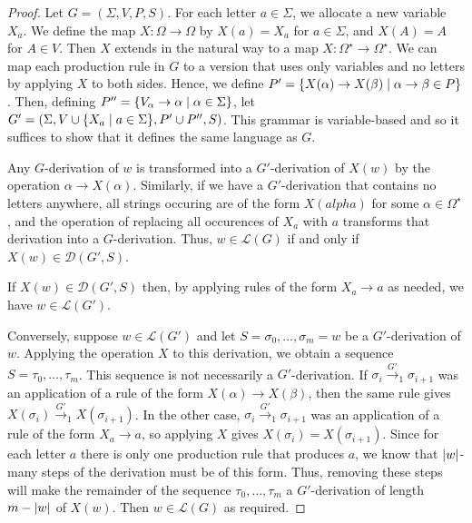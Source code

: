 \begin{proof}
	Let \( G = (\Sigma, V, P, S) \).
	For each letter \( a \in \Sigma \), we allocate a new variable \( X_a \).
	We define the map \( X \colon \Omega \to \Omega \) by \( X(a) = X_a \) for \( a \in \Sigma \), and \( X(A) = A \) for \( A \in V \).
	Then \( X \) extends in the natural way to a map \( X \colon \Omega^\star \to \Omega^\star \).
	We can map each production rule in \( G \) to a version that uses only variables and no letters by applying \( X \) to both sides.
	Hence, we define \( P' = \qty{X(\alpha) \to X(\beta) \mid \alpha \to \beta \in P} \).
	Then, defining \( P'' = \qty{V_\alpha \to \alpha \mid \alpha \in \Sigma} \), let \( G' = (\Sigma, V \cup \qty{X_a \mid a \in \Sigma}, P' \cup P'', S) \).
	This grammar is variable-based and so it suffices to show that it defines the same language as \( G \).

	Any \( G \)-derivation of \( w \) is transformed into a \( G' \)-derivation of \( X(w) \) by the operation \( \alpha \to X(\alpha) \).
	Similarly, if we have a \( G' \)-derivation that contains no letters anywhere, all strings occuring are of the form \( X(alpha) \) for some \( \alpha \in \Omega^\star \), and the operation of replacing all occurences of \( X_a \) with \( a \) transforms that derivation into a \( G \)-derivation.
	Thus, \( w \in \mathcal L(G) \) if and only if \( X(w) \in \mathcal D(G', S) \).

	If \( X(w) \in \mathcal D(G', S) \) then, by applying rules of the form \( X_a \to a \) as needed, we have \( w \in \mathcal L(G') \).

	Conversely, suppose \( w \in \mathcal L(G') \) and let \( S = \sigma_0, \dots, \sigma_m = w \) be a \( G' \)-derivation of \( w \).
	Applying the operation \( X \) to this derivation, we obtain a sequence \( S = \tau_0, \dots, \tau_m \).
	This sequence is not necessarily a \( G' \)-derivation.
	If \( \sigma_i \xrightarrow {G'}_1 \sigma_{i+1} \) was an application of a rule of the form \( X(\alpha) \to X(\beta) \), then the same rule gives \( X(\sigma_i) \xrightarrow {G'}_1 X(\sigma_{i+1}) \).
	In the other case, \( \sigma_i \xrightarrow {G'}_1 \sigma_{i+1} \) was an application of a rule of the form \( X_a \to a \), so applying \( X \) gives \( X(\sigma_i) = X(\sigma_{i+1}) \).
	Since for each letter \( a \) there is only one production rule that produces \( a \), we know that \( \abs{w} \)-many steps of the derivation must be of this form.
	Thus, removing these steps will make the remainder of the sequence \( \tau_0, \dots, \tau_m \) a \( G' \)-derivation of length \( m - \abs{w} \) of \( X(w) \).
	Then \( w \in \mathcal L(G) \) as required.
\end{proof}
